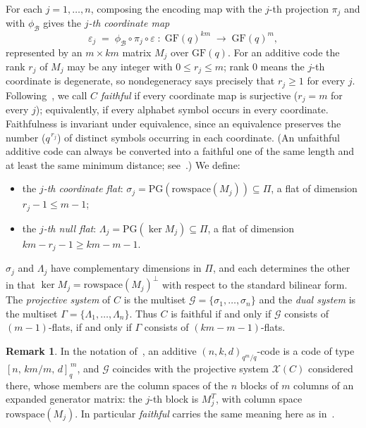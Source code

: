 \documentclass[12pt]{article}
\theoremstyle{definition}
\newtheorem{rem}[thm]{Remark}
\numberwithin{equation}{section}
\newcommand{\G}{\mathcal{G}}
\newcommand{\GF}[1]{\mathrm{GF}(#1)}
\newcommand{\PGv}[1]{\mathrm{PG}(#1)}
\begin{document}
For each $j=1,\ldots,n$, composing the encoding map with the $j$-th projection $\pi_j$ and with $\phi_{\mathcal{B}}$ gives the \textit{$j$-th coordinate map}
\[
  \varepsilon_j \;=\; \phi_{\mathcal{B}}\circ\pi_j\circ\varepsilon
    \;:\; \GF{q}^{km}\;\longrightarrow\;\GF{q}^m,
\]
represented by an $m\times km$ matrix $M_j$ over $\GF{q}$.  For an additive code the rank $r_j$ of $M_j$ may be any integer with $0\le r_j\le m$; rank $0$ means the $j$-th coordinate is degenerate, so nondegeneracy says precisely that $r_j\geq1$ for every $j$.  Following~\cite{BLP24}, we call $C$ \textit{faithful} if every coordinate map is surjective ($r_j=m$ for every $j$); equivalently, if every alphabet symbol occurs in every coordinate.  Faithfulness is invariant under equivalence, since an equivalence preserves the number ($q^{\,r_j}$) of distinct symbols occurring in each coordinate.  (An unfaithful additive code can always be converted into a faithful one of the same length and at least the same minimum distance; see~\cite[Remark~6]{BLP24}.)  We define:
\begin{itemize}
  \item the \textit{$j$-th coordinate flat}: $\sigma_j = \PGv{\mathrm{rowspace}(M_j)}\subseteq\Pi$, a flat of dimension $r_j-1\le m-1$;
  \item the \textit{$j$-th null flat}:  $\Lambda_j = \PGv{\ker M_j}\subseteq\Pi$, a flat of dimension $km-r_j-1\ge km-m-1$.
\end{itemize}
$\sigma_j$ and $\Lambda_j$ have complementary dimensions in $\Pi$, and each determines the other in that
$\ker M_j=\mathrm{rowspace}(M_j)^{\perp}$ with respect to the standard bilinear form.  The \textit{projective system} of $C$ is the multiset $\G=\{\sigma_1,\ldots,\sigma_n\}$ and the \textit{dual system} is the multiset $\Gamma=\{\Lambda_1,\ldots,\Lambda_n\}$.  Thus $C$ is faithful if and only if $\G$ consists of $(m-1)$-flats, if and only if $\Gamma$ consists of $(km-m-1)$-flats.

\begin{rem}\label{rem:BLPdict}
In the notation of~\cite{BLP24}, an additive $(n,k,d)_{q^m/q}$-code is a code of type $[n,\,km/m,\,d]_q^{\,m}$, and $\G$ coincides with the projective system $\mathcal{X}(C)$ considered there, whose members are the column spaces of the $n$ blocks of $m$ columns of an expanded generator matrix: the $j$-th block is $M_j^{T}$, with column space $\mathrm{rowspace}(M_j)$.  In particular \emph{faithful} carries the same meaning here as in~\cite{BLP24}.
\end{rem}
\end{document}
